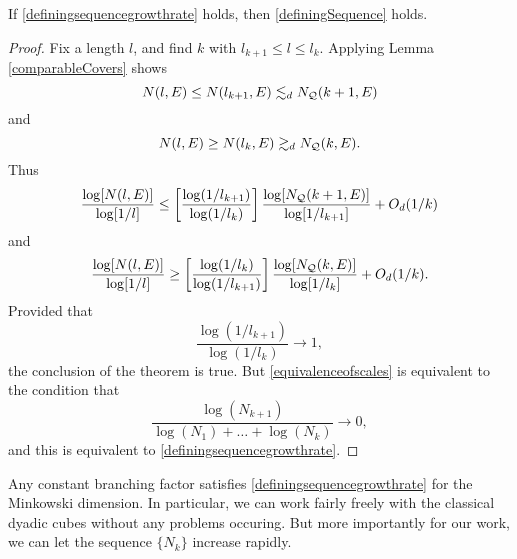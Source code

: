 \begin{theorem} \label{definingsequenceminkowski}
	If \eqref{definingsequencegrowthrate} holds, then \eqref{definingSequence} holds.
\end{theorem}
\begin{proof}
	Fix a length $l$, and find $k$ with $l_{k+1} \leq l \leq l_k$. Applying Lemma \ref{comparableCovers} shows
	\[ N(l,E) \leq N(l_{k+1},E) \lesssim_d N_{\operatorname{\mathcal{Q}}}(k+1,E) \]
	and
	\[ N(l,E) \geq N(l_k,E) \gtrsim_d N_{\operatorname{\mathcal{Q}}}(k,E). \]
	Thus
	\[ \frac{\log[N(l,E)]}{\log[1/l]} \leq \left[ \frac{\log(1/l_{k+1})}{\log(1/l_k)} \right] \frac{\log[N_{\operatorname{\mathcal{Q}}}(k+1,E)]}{\log[1/l_{k+1}]} + O_d(1/k) \]
	and
	\[ \frac{\log[N(l,E)]}{\log[1/l]} \geq \left[ \frac{\log(1/l_k)}{\log(1/l_{k+1})} \right] \frac{\log[N_{\operatorname{\mathcal{Q}}}(k,E)]}{\log[1/l_k]} + O_d(1/k). \]
	Provided that
	\begin{equation} \label{equivalenceofscales}
		\frac{\log(1/l_{k+1})}{\log(1/l_k)} \to 1,
	\end{equation}
	the conclusion of the theorem is true. But \eqref{equivalenceofscales} is equivalent to the condition that
	\[ \frac{\log(N_{k+1})}{\log(N_1) + \dots + \log(N_k)} \to 0, \]
	and this is equivalent to \eqref{definingsequencegrowthrate}.
\end{proof}

Any constant branching factor satisfies \eqref{definingsequencegrowthrate} for the Minkowski dimension. In particular, we can work fairly freely with the classical dyadic cubes without any problems occuring. But more importantly for our work, we can let the sequence $\{ N_k \}$ increase rapidly.

